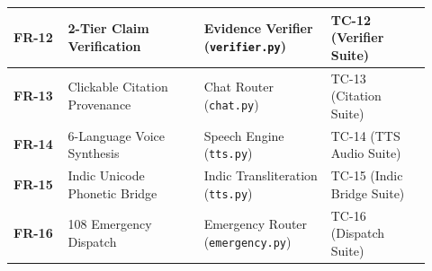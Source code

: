 \begin{longtable}{@{}p{0.12\linewidth} p{0.30\linewidth} p{0.28\linewidth} p{0.22\linewidth}@{}}
\midrule
\textbf{FR-12} & 2-Tier Claim Verification & Evidence Verifier (\texttt{verifier.py}) & TC-12 (Verifier Suite) \\
\midrule
\textbf{FR-13} & Clickable Citation Provenance & Chat Router (\texttt{chat.py}) & TC-13 (Citation Suite) \\
\midrule
\textbf{FR-14} & 6-Language Voice Synthesis & Speech Engine (\texttt{tts.py}) & TC-14 (TTS Audio Suite) \\
\midrule
\textbf{FR-15} & Indic Unicode Phonetic Bridge & Indic Transliteration (\texttt{tts.py}) & TC-15 (Indic Bridge Suite) \\
\midrule
\textbf{FR-16} & 108 Emergency Dispatch & Emergency Router (\texttt{emergency.py}) & TC-16 (Dispatch Suite) \\
\bottomrule
\end{longtable}
\normalsize

\newpage
